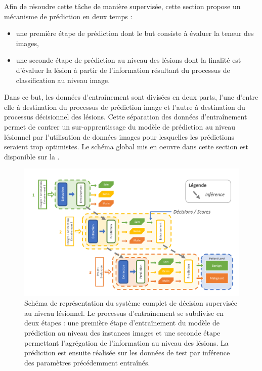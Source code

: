Afin de résoudre cette tâche de manière supervisée, cette section propose un mécanisme de prédiction en deux temps : 
\begin{itemize}
    \item une première étape de prédiction dont le but consiste à évaluer la teneur des images,
    \item une seconde étape de prédiction au niveau des lésions dont la finalité est d'évaluer la lésion à partir de l'information résultant du processus de classification au niveau image.
\end{itemize} Dans ce but, les données d'entraînement sont divisées en deux parts, l'une d'entre elle à destination du processus de prédiction image et l'autre à destination du processus décisionnel des lésions. Cette séparation des données d'entraînement permet de contrer un sur-apprentissage du modèle de prédiction au niveau lésionnel par l'utilisation de données images pour lesquelles les prédictions seraient trop optimistes. Le schéma global mis en oeuvre dans cette section est disponible sur la .\par

\begin{figure}[H]
    \centering
    \includegraphics[width=\linewidth]{contents/chapter_6/resources/scheme_patient_decision.pdf}
    \caption{Schéma de représentation du système complet de décision supervisée au niveau lésionnel. Le processus d'entraînement se subdivise en deux étapes : une première étape d'entraînement du modèle de prédiction au niveau des instances images et une seconde étape permettant l'agrégation de l'information au niveau des lésions. La prédiction est ensuite réalisée sur les données de test par inférence des paramètres précédemment entraînés.}
    \label{fig:scheme_patient_decision}
\end{figure}\par

